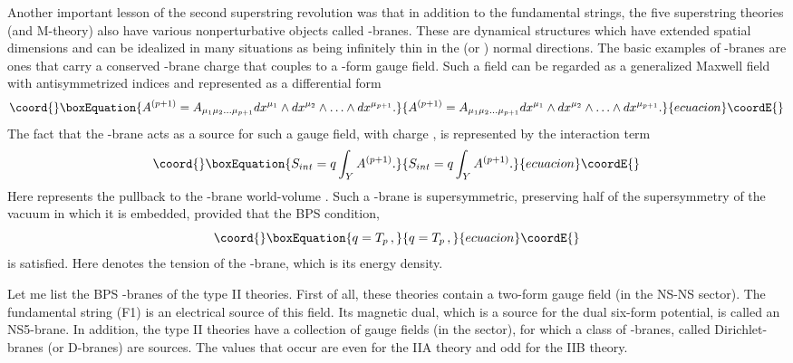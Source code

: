 \documentclass[a4paper,12pt]{article}
\begin{document}
Another important lesson of the second superstring revolution was
that in addition to the fundamental strings, the five superstring
theories (and M-theory) also have various nonperturbative objects
called \coordHE{}-branes.  These are dynamical structures which have \coordHE{}
extended spatial dimensions and can be idealized in many
situations as being infinitely thin in the \coordHE{} (or \coordHE{})
normal directions. The basic examples of \coordHE{}-branes are ones that
carry a conserved \coordHE{}-brane charge that couples to a \coordHE{}-form gauge field. Such a field can be regarded as a
generalized Maxwell field with \coordHE{} antisymmetrized indices and
represented as a differential form
\begin{equation}\coord{}\boxEquation{
A^{(p+1)} = A_{\mu_{1}\mu_{2}\ldots \mu_{p+1}} dx^{\mu_{1}} \wedge dx^{\mu_{2}}
\wedge\ldots \wedge dx^{\mu_{p+1}}.
}{
A^{(p+1)} = A_{\mu_{1}\mu_{2}\ldots \mu_{p+1}} dx^{\mu_{1}} \wedge dx^{\mu_{2}}
\wedge\ldots \wedge dx^{\mu_{p+1}}.
}{ecuacion}\coordE{}\end{equation}
The fact that the \coordHE{}-brane acts as a source for such a gauge field, with
charge \coordHE{}, is represented by the interaction term
\begin{equation}\coord{}\boxEquation{
S_{int} = q \int_Y A^{(p + 1)}.
}{
S_{int} = q \int_Y A^{(p + 1)}.
}{ecuacion}\coordE{}\end{equation}
Here \coordHE{} represents the pullback to the \coordHE{}-brane
world-volume \coordHE{}. Such a \coordHE{}-brane is supersymmetric, preserving
half of the supersymmetry of the vacuum in which it is embedded,
provided that the BPS condition,
\begin{equation}\coord{}\boxEquation{
q = T_p \, ,
}{
q = T_p \, ,
}{ecuacion}\coordE{}\end{equation}
is satisfied.  Here \coordHE{} denotes the tension of the \coordHE{}-brane, which is its
energy density.

Let me list the BPS \coordHE{}-branes of the type II theories.  First of
all, these theories contain a two-form gauge field \coordHE{} (in
the NS-NS sector).  The fundamental string (F1) is an electrical
source of this field.  Its magnetic dual, which is a source for
the dual six-form potential, is called an NS5-brane. In addition,
the type II theories have a collection of gauge fields \coordHE{}
(in the \coordHE{} sector), for which a class of \coordHE{}-branes, called
Dirichlet-branes (or D\coordHE{}-branes) are sources. The \coordHE{} values that
occur are even for the IIA theory and odd for the IIB theory.
\end{document}
